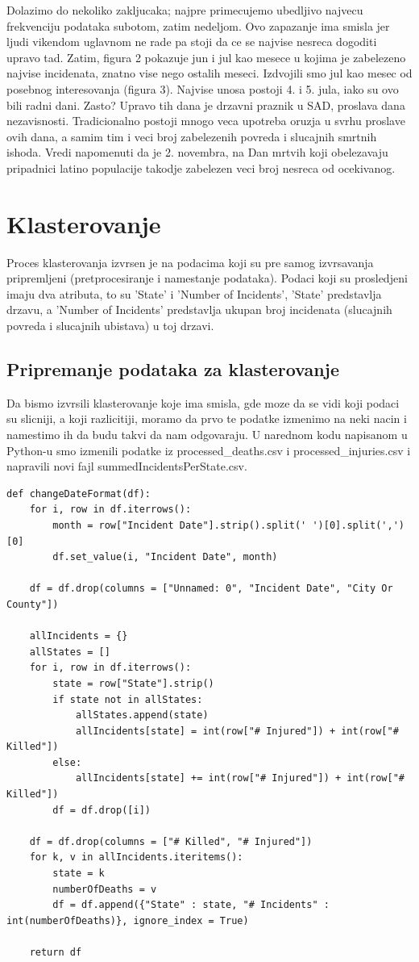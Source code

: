 \documentclass[11pt]{article} %
\begin{document}
Dolazimo do nekoliko zakljucaka; najpre primecujemo ubedljivo najvecu frekvenciju podataka subotom, zatim nedeljom. 
Ovo zapazanje ima smisla jer ljudi vikendom uglavnom ne rade pa stoji da ce se najvise nesreca dogoditi upravo tad.
Zatim, figura 2 pokazuje jun i jul kao mesece u kojima je zabelezeno najvise incidenata, znatno vise nego ostalih 
meseci. Izdvojili smo jul kao mesec od posebnog interesovanja (figura 3). Najvise unosa postoji 4. i 5. jula, iako 
su ovo bili radni dani. Zasto? Upravo tih dana je drzavni praznik u SAD, proslava dana nezavisnosti. Tradicionalno
postoji mnogo veca upotreba oruzja u svrhu proslave ovih dana, a samim tim i veci broj zabelezenih povreda i slucajnih 
smrtnih ishoda. Vredi napomenuti da je 2. novembra, na Dan mrtvih koji obelezavaju pripadnici latino populacije takodje
zabelezen veci broj nesreca od ocekivanog.

	
	
	\newpage
	\section{Klasterovanje}
	Proces klasterovanja izvrsen je na podacima koji su pre samog izvrsavanja pripremljeni (pretprocesiranje i namestanje podataka). 
	Podaci koji su prosledjeni imaju dva atributa, to su 'State' i 'Number of Incidents', 'State' predstavlja drzavu, a 'Number of Incidents' predstavlja 
	ukupan broj incidenata (slucajnih povreda i slucajnih ubistava) u toj drzavi.
	
	\subsection{Pripremanje podataka za klasterovanje}
	Da bismo izvrsili klasterovanje koje ima smisla, gde moze da se vidi koji podaci su slicniji, a koji razlicitiji, moramo da prvo te podatke izmenimo na 
	neki nacin i namestimo ih da budu takvi da nam odgovaraju. U narednom kodu napisanom u Python-u smo izmenili podatke iz 
	processed\_deaths.csv i processed\_injuries.csv i napravili novi fajl summedIncidentsPerState.csv.
	\newline
	
	\begin{lstlisting}
def changeDateFormat(df):
	for i, row in df.iterrows():
		month = row["Incident Date"].strip().split(' ')[0].split(',')[0]
		df.set_value(i, "Incident Date", month)
	
	df = df.drop(columns = ["Unnamed: 0", "Incident Date", "City Or County"])
	
	allIncidents = {}
	allStates = []
	for i, row in df.iterrows():
		state = row["State"].strip()
		if state not in allStates:
			allStates.append(state)
			allIncidents[state] = int(row["# Injured"]) + int(row["# Killed"])
		else:
			allIncidents[state] += int(row["# Injured"]) + int(row["# Killed"])
		df = df.drop([i])
	
	df = df.drop(columns = ["# Killed", "# Injured"])
	for k, v in allIncidents.iteritems():
		state = k
		numberOfDeaths = v
		df = df.append({"State" : state, "# Incidents" : int(numberOfDeaths)}, ignore_index = True)
	
	return df
	
    \end{lstlisting}
	
\end{document}
